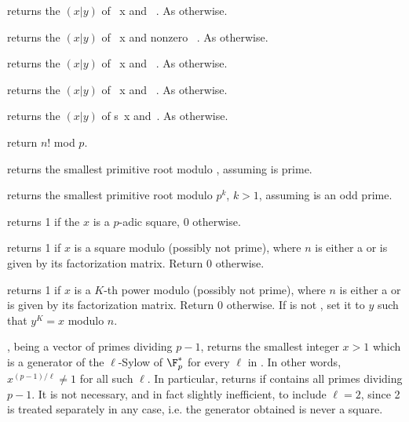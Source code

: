  returns the  $(x|y)$
of ~x and ~. As  otherwise.

 returns the  $(x|y)$
of ~x and nonzero ~. As  otherwise.

 returns the  $(x|y)$
of ~x and ~. As  otherwise.

 returns the  $(x|y)$
of ~x and ~. As  otherwise.

 returns the  $(x|y)$
of s~x and~. As  otherwise.

 return $n!$ mod $p$.

 returns the smallest primitive root modulo
, assuming  is prime.

 returns the smallest primitive root modulo $p^k$,
$k > 1$, assuming  is an odd prime.

 returns 1 if the  $x$ is
a $p$-adic square, $0$ otherwise.

 returns 1 if  $x$ is
a square modulo  (possibly not prime), where $n$ is either a 
or is given by its factorization matrix. Return $0$ otherwise.

 returns 1 if 
$x$ is a $K$-th power modulo  (possibly not prime), where $n$ is
either a  or is given by its factorization matrix. Return $0$
otherwise. If  is not , set it to $y$ such that $y^K = x$
modulo $n$.

,  being a vector of
primes dividing $p - 1$, returns the smallest integer $x > 1$ which is a
generator of the $\ell$-Sylow of $\F_p^*$ for every $\ell$ in . In
other words, $x^{(p-1)/\ell} \neq 1$ for all such $\ell$. In particular,
returns  if  contains all primes dividing $p - 1$.
It is not necessary, and in fact slightly inefficient, to include $\ell=2$,
since 2 is treated separately in any case, i.e. the generator obtained is
never a square.

